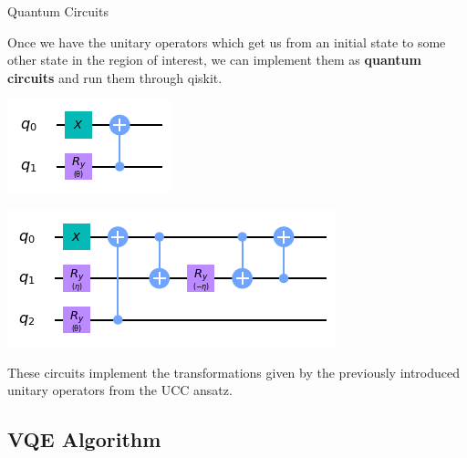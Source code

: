 \documentclass[9pt, handout, aspectratio=169]{beamer}		%
\begin{document}
	\begin{frame}{Quantum Circuits}

		Once we have the unitary operators which get us from an initial state to some other state in the region of interest, we can implement them as \textbf{quantum circuits} and run them through qiskit.

		\begin{multicols}{2}

			\begin{center}
				\includegraphics[height=.24\paperheight]{Figures/u2_circuit}
			\end{center}

			\columnbreak

			\begin{center}
				\includegraphics[height=.24\paperheight]{Figures/u3_circuit}
			\end{center}

		\end{multicols}

		These circuits implement the transformations given by the previously introduced unitary operators from the UCC ansatz.

	\end{frame}


	\subsection{VQE Algorithm}
\end{document}
